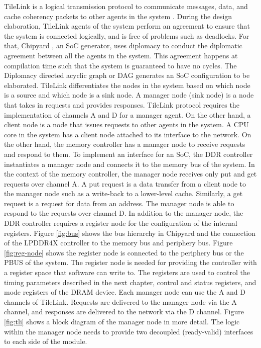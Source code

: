 TileLink is a logical transmission protocol to communicate messages, data, and cache coherency packets to other agents in the system \cite{tilelink}. During the design elaboration, TileLink agents of the system perform an agreement to ensure that the system is connected logically, and is free of problems such as deadlocks. For that, Chipyard \cite{chipyard}, an SoC generator, uses diplomacy to conduct the diplomatic agreement between all the agents in the system. This agreement happens at compilation time such that the system is guaranteed to have no cycles. The Diplomacy directed acyclic graph or DAG generates an SoC configuration to be elaborated. TileLink differentiates the nodes in the system based on which node is a source and which node is a sink node. A manager node (sink node) is a node that takes in requests and provides responses. TileLink protocol requires the implementation of channels A and D for a manager agent. On the other hand, a client node is a node that issues requests to other agents in the system. A CPU core in the system has a client node attached to its interface to the network. On the other hand, the memory controller has a manager node to receive requests and respond to them. To implement an interface for an SoC, the DDR controller instantiates a manager node and connects it to the memory bus of the system. In the context of the memory controller, the manager node receives only put and get requests over channel A. A put request is a data transfer from a client node to the manager node such as a write-back to a lower-level cache. Similarly, a get request is a request for data from an address. The manager node is able to respond to the requests over channel D. In addition to the manager node, the DDR controller requires a register node for the configuration of the internal registers. Figure \ref{fig:bus} shows the bus hierarchy in Chipyard and the connection of the LPDDR4X controller to the memory bus and periphery bus. Figure \ref{fig:reg-node} shows the register node is connected to the periphery bus or the PBUS of the system. The register node is needed for providing the controller with a register space that software can write to. The registers are used to control the timing parameters described in the next chapter, control and status registers, and mode registers of the DRAM device.  Each manager node can use the A and D channels of TileLink. Requests are delivered to the manager node via the A channel, and responses are delivered to the network via the D channel. Figure \ref{fig:tli}  shows a block diagram of the manager node in more detail. The logic within the manager node needs to provide two decoupled (ready-valid) interfaces to each side of the module.

